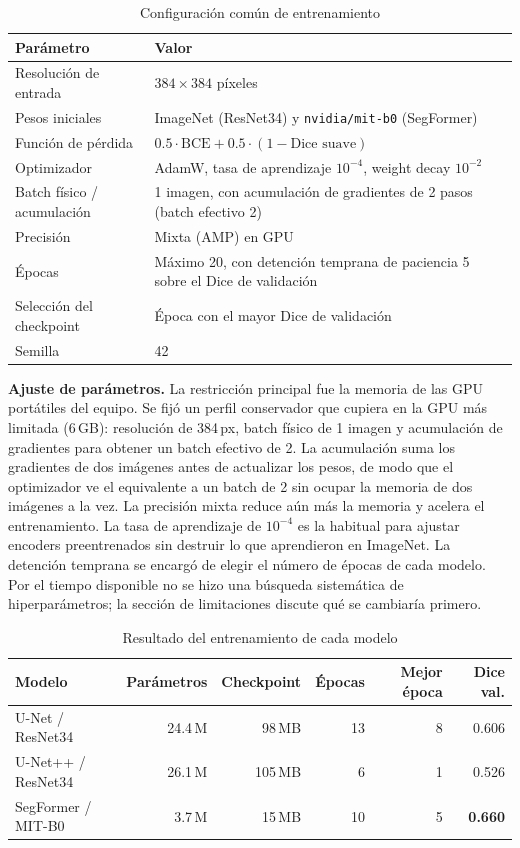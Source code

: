 \documentclass[11pt,letterpaper]{article}
\begin{document}
\begin{table}[H]
\centering
\caption{Configuración común de entrenamiento}
\begin{tabular}{lp{9.5cm}}
\toprule
\textbf{Parámetro} & \textbf{Valor} \\
\midrule
Resolución de entrada      & $384 \times 384$ píxeles \\
Pesos iniciales            & ImageNet (ResNet34) y \texttt{nvidia/mit-b0} (SegFormer) \\
Función de pérdida         & $0.5 \cdot \text{BCE} + 0.5 \cdot (1 - \text{Dice suave})$ \\
Optimizador                & AdamW, tasa de aprendizaje $10^{-4}$, weight decay $10^{-2}$ \\
Batch físico / acumulación & 1 imagen, con acumulación de gradientes de 2 pasos (batch efectivo 2) \\
Precisión                  & Mixta (AMP) en GPU \\
Épocas                     & Máximo 20, con detención temprana de paciencia 5 sobre el Dice de
                             validación \\
Selección del checkpoint   & Época con el mayor Dice de validación \\
Semilla                    & 42 \\
\bottomrule
\end{tabular}
\end{table}

\textbf{Ajuste de parámetros.} La restricción principal fue la memoria de las GPU portátiles del
equipo. Se fijó un perfil conservador que cupiera en la GPU más limitada (6\,GB): resolución de
384\,px, batch físico de 1 imagen y acumulación de gradientes para obtener un batch efectivo de 2. La
acumulación suma los gradientes de dos imágenes antes de actualizar los pesos, de modo que el
optimizador ve el equivalente a un batch de 2 sin ocupar la memoria de dos imágenes a la vez. La
precisión mixta reduce aún más la memoria y acelera el entrenamiento. La tasa de aprendizaje de
$10^{-4}$ es la habitual para ajustar encoders preentrenados sin destruir lo que aprendieron en
ImageNet. La detención temprana se encargó de elegir el número de épocas de cada modelo. Por el
tiempo disponible no se hizo una búsqueda sistemática de hiperparámetros; la sección de limitaciones
discute qué se cambiaría primero.

\begin{table}[H]
\centering
\caption{Resultado del entrenamiento de cada modelo}
\begin{tabular}{lrrrrr}
\toprule
\textbf{Modelo} & \textbf{Parámetros} & \textbf{Checkpoint} & \textbf{Épocas} & \textbf{Mejor época} & \textbf{Dice val.} \\
\midrule
U-Net / ResNet34    & 24.4\,M & 98\,MB  & 13 & 8 & 0.606 \\
U-Net++ / ResNet34  & 26.1\,M & 105\,MB &  6 & 1 & 0.526 \\
SegFormer / MIT-B0  &  3.7\,M & 15\,MB  & 10 & 5 & \textbf{0.660} \\
\bottomrule
\end{tabular}
\end{table}
\end{document}
